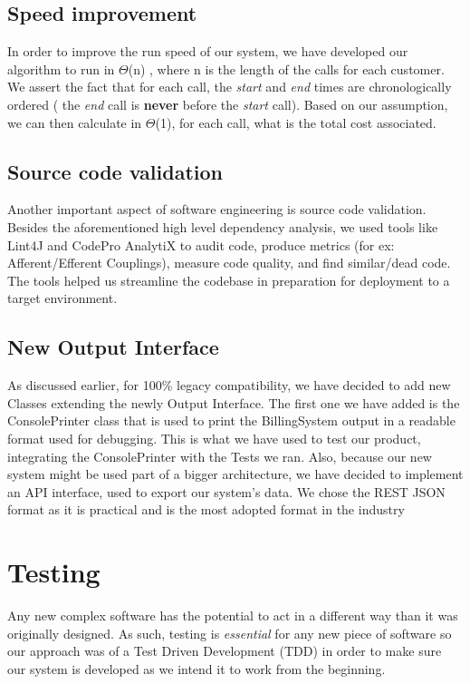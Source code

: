 \documentclass[11pt,twocolumn]{article} %
\begin{document}
\subsection{Speed improvement}

In order to improve the run speed of our system, we have developed our algorithm to run in $\Theta$(n)
, where n is the length of the calls for each customer. We assert the fact that for each call,
the \textit{start} and \textit{end} times are chronologically ordered ( the \textit{end} call is \textbf{never}
before the \textit{start} call). Based on our assumption, we can then calculate in $\Theta$(1), for each call,
what is the total cost associated. 

\subsection{Source code validation}
Another important aspect of software engineering is source code validation. Besides the
aforementioned high level dependency analysis, we used tools like Lint4J
and CodePro AnalytiX to audit code, produce metrics (for ex: Afferent/Efferent Couplings), measure code quality, 
and find similar/dead code. The tools helped us streamline the codebase in preparation for deployment to a target environment.


\subsection{New Output Interface}
As discussed earlier, for 100\% legacy compatibility, we have decided to add new Classes extending the newly Output Interface. 
The first one we have added is the ConsolePrinter class that is used to print the BillingSystem output in a readable 
format used for debugging. This is what we have used to test our product, integrating the ConsolePrinter with the Tests we ran. 
Also, because our new system might be used part of a bigger architecture, we have decided to implement an API interface, 
used to export our system's data. We chose the REST JSON format as it is practical and is the most adopted format in the industry

\section{Testing}
Any new complex software has the potential to act in a different way than it was originally designed. As such, testing is \textit{essential} for any new piece of software 
so our approach was of a Test Driven Development (TDD) in order to make sure our system is developed as we intend it to work from the beginning. 
\end{document}
